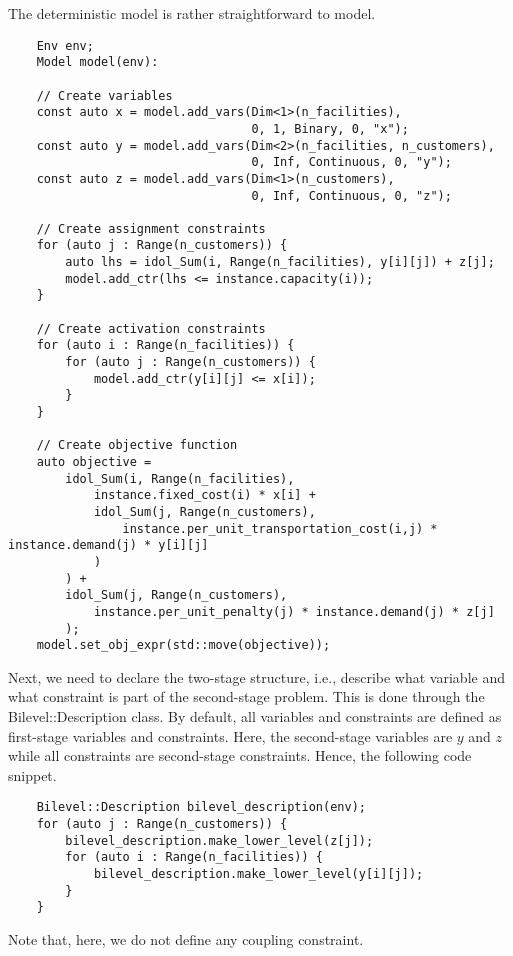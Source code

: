 The deterministic model is rather straightforward to model. 
%
\begin{lstlisting}
    Env env;
    Model model(env):

    // Create variables
    const auto x = model.add_vars(Dim<1>(n_facilities), 
                                  0, 1, Binary, 0, "x");
    const auto y = model.add_vars(Dim<2>(n_facilities, n_customers),
                                  0, Inf, Continuous, 0, "y");
    const auto z = model.add_vars(Dim<1>(n_customers),
                                  0, Inf, Continuous, 0, "z");

    // Create assignment constraints
    for (auto j : Range(n_customers)) {
        auto lhs = idol_Sum(i, Range(n_facilities), y[i][j]) + z[j];
        model.add_ctr(lhs <= instance.capacity(i));
    }

    // Create activation constraints
    for (auto i : Range(n_facilities)) {
        for (auto j : Range(n_customers)) {
            model.add_ctr(y[i][j] <= x[i]);
        }
    }

    // Create objective function
    auto objective = 
        idol_Sum(i, Range(n_facilities), 
            instance.fixed_cost(i) * x[i] +
            idol_Sum(j, Range(n_customers),
                instance.per_unit_transportation_cost(i,j) * instance.demand(j) * y[i][j]
            )
        ) + 
        idol_Sum(j, Range(n_customers), 
            instance.per_unit_penalty(j) * instance.demand(j) * z[j]
        );
    model.set_obj_expr(std::move(objective));
\end{lstlisting}

Next, we need to declare the two-stage structure, i.e., describe what variable
and what constraint is part of the second-stage problem. This is done through
the \textsf{Bilevel::Description} class. By default, all variables and
constraints are defined as first-stage variables and constraints. Here, the
second-stage variables are $y$ and $z$ while all constraints are second-stage
constraints. Hence, the following code snippet.
%
\begin{lstlisting}
    Bilevel::Description bilevel_description(env);
    for (auto j : Range(n_customers)) {
        bilevel_description.make_lower_level(z[j]);
        for (auto i : Range(n_facilities)) {
            bilevel_description.make_lower_level(y[i][j]);
        }
    }
\end{lstlisting}
Note that, here, we do not define any coupling constraint.

